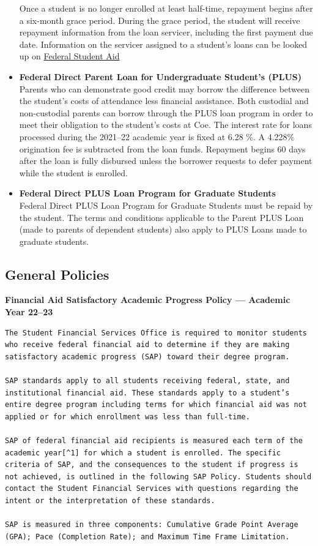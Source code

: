 \documentclass[
  letterpaper,
]{scrbook}
\begin{document}
\begin{itemize}
  Once a student is no longer enrolled at least half-time, repayment
  begins after a six-month grace period. During the grace period, the
  student will receive repayment information from the loan servicer,
  including the first payment due date. Information on the servicer
  assigned to a student's loans can be looked up on
  \href{studentaid.gov.}{Federal Student Aid}
\item
  \textbf{Federal Direct Parent Loan for Undergraduate Student's (PLUS)}
  Parents who can demonstrate good credit may borrow the difference
  between the student's costs of attendance less financial assistance.
  Both custodial and non-custodial parents can borrow through the PLUS
  loan program in order to meet their obligation to the student's costs
  at Coe. The interest rate for loans processed during the 2021--22
  academic year is fixed at 6.28 \%. A 4.228\% origination fee is
  subtracted from the loan funds. Repayment begins 60 days after the
  loan is fully disbursed unless the borrower requests to defer payment
  while the student is enrolled.
\item
  \textbf{Federal Direct PLUS Loan Program for Graduate Students}\\
  Federal Direct PLUS Loan Program for Graduate Students must be repaid
  by the student. The terms and conditions applicable to the Parent PLUS
  Loan (made to parents of dependent students) also apply to PLUS Loans
  made to graduate students.
\end{itemize}

\hypertarget{sec-financial-aid-satisfactory-academic-prgress-policy}{%
\subsection{General
Policies}\label{sec-financial-aid-satisfactory-academic-prgress-policy}}

\textbf{Financial Aid Satisfactory Academic Progress Policy --- Academic
Year 22--23}

\begin{verbatim}
The Student Financial Services Office is required to monitor students who receive federal financial aid to determine if they are making satisfactory academic progress (SAP) toward their degree program.

SAP standards apply to all students receiving federal, state, and institutional financial aid. These standards apply to a student’s entire degree program including terms for which financial aid was not applied or for which enrollment was less than full-time.  

SAP of federal financial aid recipients is measured each term of the academic year[^1] for which a student is enrolled. The specific criteria of SAP, and the consequences to the student if progress is not achieved, is outlined in the following SAP Policy. Students should contact the Student Financial Services with questions regarding the intent or the interpretation of these standards.

SAP is measured in three components: Cumulative Grade Point Average (GPA); Pace (Completion Rate); and Maximum Time Frame Limitation.
\end{verbatim}
\end{document}
